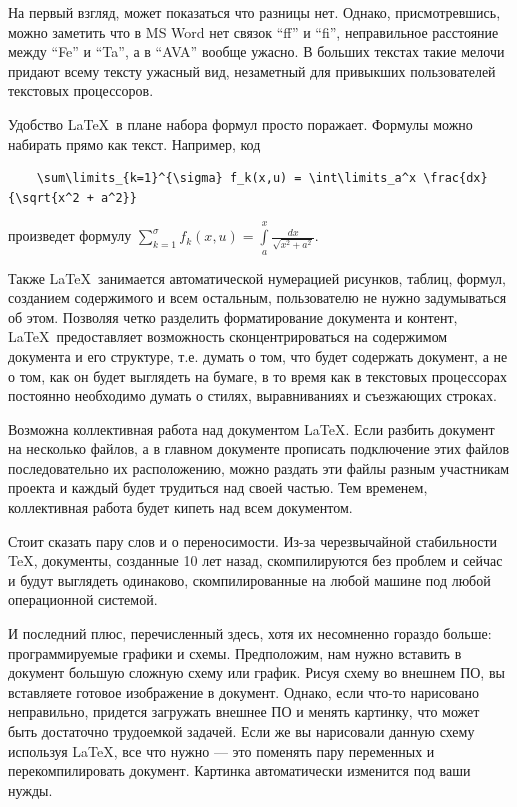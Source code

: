 На первый взгляд, может показаться что разницы нет. Однако, присмотревшись, можно заметить что в MS Word нет связок ``ff'' и ``fi'', неправильное расстояние между ``Fe'' и ``Ta'', а в ``AVA'' вообще ужасно. В больших текстах такие мелочи придают всему тексту ужасный вид, незаметный для привыкших пользователей текстовых процессоров.

Удобство \LaTeX~в плане набора формул просто поражает. Формулы можно набирать прямо как текст. Например, код

\begin{verbatim}
    \sum\limits_{k=1}^{\sigma} f_k(x,u) = \int\limits_a^x \frac{dx}{\sqrt{x^2 + a^2}}
\end{verbatim}

произведет формулу $\sum\limits_{k=1}^{\sigma} f_k(x,u) = \int\limits_a^x \frac{dx}{\sqrt{x^2 + a^2}}$.

Также \LaTeX~занимается автоматической нумерацией рисунков, таблиц, формул, созданием содержимого и всем остальным, пользователю не нужно задумываться об этом. Позволяя четко разделить форматирование документа и контент, \LaTeX~предоставляет возможность сконцентрироваться на содержимом документа и его структуре, т.е. думать о том, что будет содержать документ, а не о том, как он будет выглядеть на бумаге, в то время как в текстовых процессорах постоянно необходимо думать о стилях, выравниваниях и съезжающих строках.

Возможна коллективная работа над документом \LaTeX. Если разбить документ на несколько файлов, а в главном документе прописать подключение этих файлов последовательно их расположению, можно раздать эти файлы разным участникам проекта и каждый будет трудиться над своей частью. Тем временем, коллективная работа будет кипеть над всем документом.

Стоит сказать пару слов и о переносимости. Из-за черезвычайной стабильности \TeX, документы, созданные 10 лет назад, скомпилируются без проблем и сейчас и будут выглядеть одинаково, скомпилированные на любой машине под любой операционной системой.

И последний плюс, перечисленный здесь, хотя их несомненно гораздо больше: программируемые графики и схемы. Предположим, нам нужно вставить в документ большую сложную схему или график. Рисуя схему во внешнем ПО, вы вставляете готовое изображение в документ. Однако, если что-то нарисовано неправильно, придется загружать внешнее ПО и менять картинку, что может быть достаточно трудоемкой задачей. Если же вы нарисовали данную схему используя \LaTeX, все что нужно --- это поменять пару переменных и перекомпилировать документ. Картинка автоматически изменится под ваши нужды.

